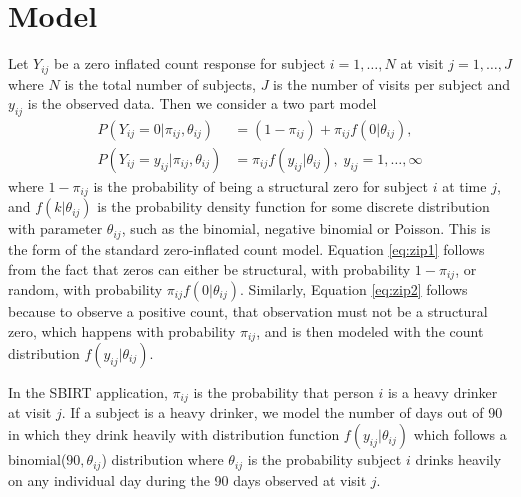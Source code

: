 \documentclass[12pt]{article}
\begin{document}
\section{Model}
\label{s:model}

Let $Y_{ij}$ be a zero inflated count response for subject $i=1,\dots,N$ at visit $j=1, \dots, J$ where $N$ is the total number of subjects, $J$ is the number of visits per subject and $y_{ij}$ is the observed data. Then we consider a two part model
\begin{align}
	P(Y_{ij} = 0 | \pi_{ij}, \theta_{ij}) &= (1 - \pi_{ij}) + \pi_{ij} f(0 | \theta_{ij}), \label{eq:zip1} \\
	P(Y_{ij} = y_{ij} | \pi_{ij}, \theta_{ij}) &= \pi_{ij} f(y_{ij}| \theta_{ij}), \; y_{ij}=1, \dots, \infty \label{eq:zip2}
\end{align}
where $1-\pi_{ij}$ is the probability of being a structural zero for subject $i$ at time $j$, and $f(k| \theta_{ij})$ is the probability density function for some discrete distribution with parameter $\theta_{ij}$, such as the binomial, negative binomial or Poisson. This is the form of the standard zero-inflated count model. Equation \eqref{eq:zip1} follows from the fact that zeros can either be structural, with probability $1-\pi_{ij}$, or random, with probability $\pi_{ij} f(0 | \theta_{ij})$. Similarly, Equation \eqref{eq:zip2} follows because to observe a positive count, that observation must not be a structural zero, which happens with probability $\pi_{ij}$, and is then modeled with the count distribution $f(y_{ij}| \theta_{ij})$.

In the SBIRT application, $\pi_{ij}$ is the probability that person $i$ is a heavy drinker at visit $j$. If a subject is a heavy drinker, we model the number of days out of 90 in which they drink heavily with distribution function $f(y_{ij}| \theta_{ij})$ which follows a binomial($90, \theta_{ij}$) distribution where $\theta_{ij}$ is the probability subject $i$ drinks heavily on any individual day during the 90 days observed at visit $j$. 
\end{document}
